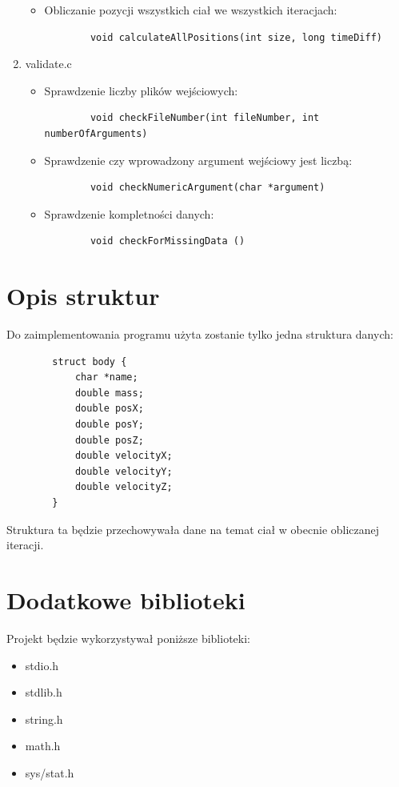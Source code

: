 \documentclass[a4paper,11pt,notitlepage]{article}
\begin{document}
\begin{enumerate}[noitemsep]
\begin{itemize}
		\item Obliczanie pozycji wszystkich ciał we wszystkich iteracjach:
		\footnotesize\begin{verbatim}
		void calculateAllPositions(int size, long timeDiff)
		\end{verbatim}\normalsize
	\end{itemize}
	\item validate.c
	\begin{itemize}
		\item Sprawdzenie liczby plików wejściowych:
		\footnotesize\begin{verbatim}
		void checkFileNumber(int fileNumber, int numberOfArguments)
		\end{verbatim}\normalsize
		\item Sprawdzenie czy wprowadzony argument wejściowy jest liczbą:
		\footnotesize\begin{verbatim}
		void checkNumericArgument(char *argument)
		\end{verbatim}\normalsize
		\item Sprawdzenie kompletności danych:
		\footnotesize\begin{verbatim}
		void checkForMissingData ()
		\end{verbatim}\normalsize
	\end{itemize}
\end{enumerate}

\section{Opis struktur}
Do zaimplementowania programu użyta zostanie tylko jedna struktura danych:

		\footnotesize\begin{verbatim}
		struct body {
    		char *name;
   			double mass;
    		double posX;
    		double posY;
    		double posZ;
    		double velocityX;
    		double velocityY;
    		double velocityZ;
		}
		\end{verbatim}\normalsize
		
Struktura ta będzie przechowywała dane na temat ciał w obecnie obliczanej iteracji.

\section{Dodatkowe biblioteki}
Projekt będzie wykorzystywał poniższe biblioteki:
\begin{itemize}
		\item stdio.h
		\item stdlib.h
		\item string.h
		\item math.h
		\item sys/stat.h
	\end{itemize}
\end{document}
